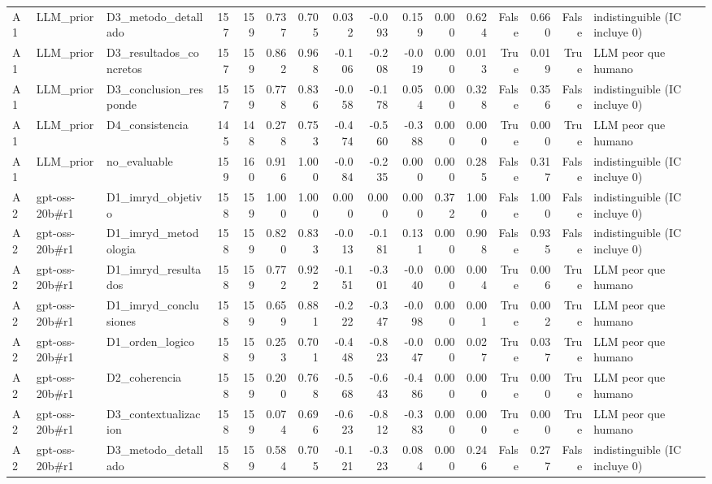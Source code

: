 \begin{table}
{\begin{tabular}{lllrrrrrrrrrrrrl}
A1 & LLM\_prior & D3\_metodo\_detallado & 157 & 159 & 0.737 & 0.705 & 0.032 & -0.093 & 0.159 & 0.000 & 0.624 & False & 0.660 & False & indistinguible (IC incluye 0) \\
A1 & LLM\_prior & D3\_resultados\_concretos & 157 & 159 & 0.862 & 0.968 & -0.106 & -0.208 & -0.019 & 0.000 & 0.013 & True & 0.019 & True & LLM peor que humano \\
A1 & LLM\_prior & D3\_conclusion\_responde & 157 & 159 & 0.778 & 0.836 & -0.058 & -0.178 & 0.054 & 0.000 & 0.328 & False & 0.356 & False & indistinguible (IC incluye 0) \\
A1 & LLM\_prior & D4\_consistencia & 145 & 148 & 0.278 & 0.753 & -0.474 & -0.560 & -0.388 & 0.000 & 0.000 & True & 0.000 & True & LLM peor que humano \\
A1 & LLM\_prior & no\_evaluable & 159 & 160 & 0.916 & 1.000 & -0.084 & -0.235 & 0.000 & 0.000 & 0.285 & False & 0.317 & False & indistinguible (IC incluye 0) \\
A2 & gpt-oss-20b\#r1 & D1\_imryd\_objetivo & 158 & 159 & 1.000 & 1.000 & 0.000 & 0.000 & 0.000 & 0.372 & 1.000 & False & 1.000 & False & indistinguible (IC incluye 0) \\
A2 & gpt-oss-20b\#r1 & D1\_imryd\_metodologia & 158 & 159 & 0.820 & 0.833 & -0.013 & -0.181 & 0.131 & 0.000 & 0.908 & False & 0.935 & False & indistinguible (IC incluye 0) \\
A2 & gpt-oss-20b\#r1 & D1\_imryd\_resultados & 158 & 159 & 0.772 & 0.922 & -0.151 & -0.301 & -0.040 & 0.000 & 0.004 & True & 0.006 & True & LLM peor que humano \\
A2 & gpt-oss-20b\#r1 & D1\_imryd\_conclusiones & 158 & 159 & 0.659 & 0.881 & -0.222 & -0.347 & -0.098 & 0.000 & 0.001 & True & 0.002 & True & LLM peor que humano \\
A2 & gpt-oss-20b\#r1 & D1\_orden\_logico & 158 & 159 & 0.253 & 0.701 & -0.448 & -0.823 & -0.047 & 0.000 & 0.027 & True & 0.037 & True & LLM peor que humano \\
A2 & gpt-oss-20b\#r1 & D2\_coherencia & 158 & 159 & 0.200 & 0.768 & -0.568 & -0.643 & -0.486 & 0.000 & 0.000 & True & 0.000 & True & LLM peor que humano \\
A2 & gpt-oss-20b\#r1 & D3\_contextualizacion & 158 & 159 & 0.074 & 0.696 & -0.623 & -0.812 & -0.383 & 0.000 & 0.000 & True & 0.000 & True & LLM peor que humano \\
A2 & gpt-oss-20b\#r1 & D3\_metodo\_detallado & 158 & 159 & 0.584 & 0.705 & -0.121 & -0.323 & 0.084 & 0.000 & 0.246 & False & 0.277 & False & indistinguible (IC incluye 0) \\

\end{tabular}}
\end{table}
